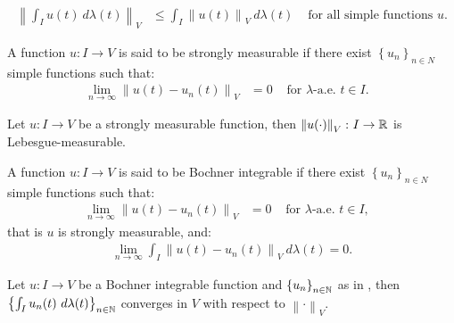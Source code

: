 \begin{lemma} %
    \begin{align}
        \left\lVert \int_I u(t) ~ d \lambda(t) \right\rVert_V &\leq \int_I \left\lVert u(t) \right\rVert_V ~ d \lambda(t) &\text{ for all simple functions } u.
    \end{align}
\end{lemma}

\begin{definition}
    A function $u\colon I \rightarrow V$ is said to be strongly measurable if there exist $\left\{ u_n \right\}_{n \in N}$ simple functions such that:
    \begin{align}
        \lim_{n \rightarrow \infty} \left\lVert u(t) - u_n(t) \right\rVert_V &= 0 &\text{ for } \lambda \text{-a.e. } t \in I.
&    \end{align}
\end{definition}

\begin{lemma}
    Let $u\colon I \rightarrow V$ be a strongly measurable function, then $\left\lVert u(\cdot) \right\rVert_V \colon I \rightarrow \mathbb{R}$ is Lebesgue-measurable.
\end{lemma}

\begin{definition} \label{definition:bochner_integrable}
    A function $u\colon I \rightarrow V$ is said to be Bochner integrable if there exist $\left\{ u_n \right\}_{n \in N}$ simple functions such that:
    \begin{align}
        \lim_{n \rightarrow \infty} \left\lVert u(t) - u_n(t) \right\rVert_V &= 0 &\text{ for } \lambda \text{-a.e. } t \in I,
&    \end{align}
    that is  $u$ is strongly measurable, and:
    \begin{align}
        \lim_{n \rightarrow \infty} \int_I \left\lVert u(t) - u_n(t) \right\rVert_V ~ d \lambda(t) = 0.
    \end{align}
\end{definition}

\begin{lemma}
    Let $u\colon I \rightarrow V$ be a Bochner integrable function and $\left\{ u_n \right\}_{n \in \mathbb{N}}$ as in , then $\left\{ \int_I u_n(t) ~ d \lambda(t) \right\}_{n \in \mathbb{N}}$ converges in $V$ with respect to $\left\lVert \cdot \right\rVert_V$.
\end{lemma}

